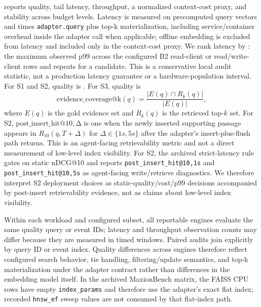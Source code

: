 \sys reports quality, tail latency, throughput, a normalized context-cost proxy, and stability across budget levels. Latency is measured on precomputed query vectors and times \texttt{adapter.query} plus top-k materialization, including service/container overhead inside the adapter call when applicable; offline embedding is excluded from latency and included only in the context-cost proxy. We rank latency by \maxrowp: the maximum observed p99 across the configured B2 read-client or read/write-client rows and repeats for a candidate. This is a conservative local audit statistic, not a production latency guarantee or a hardware-population interval. For S1 and S2, quality is \ndcg. For S3, quality is
\[
\mathrm{evidence\_coverage@k}(q)=\frac{|E(q)\cap R_k(q)|}{|E(q)|},
\]
where $E(q)$ is the gold evidence set and $R_k(q)$ is the retrieved top-$k$ set. For S2, \(\mathrm{post\_insert\_hit@10,\Delta}\) is one when the newly inserted supporting passage appears in $R_{10}(q,T+\Delta)$ for $\Delta\in\{1s,5s\}$ after the adapter's insert-plus-flush path returns. This is an agent-facing retrievability metric and not a direct measurement of low-level index visibility. For S2, the archived strict-latency rule gates on static nDCG@10 and reports \texttt{post\_insert\_hit@10,1s} and \texttt{post\_insert\_hit@10,5s} as agent-facing write/retrieve diagnostics. We therefore interpret S2 deployment choices as static-quality/cost/p99 decisions accompanied by post-insert retrievability evidence, not as claims about low-level index visibility.

Within each workload and configured subset, all reportable engines evaluate the same quality query or event IDs; latency and throughput observation counts may differ because they are measured in timed windows. Paired audits join explicitly by query ID or event index. Quality differences across engines therefore reflect configured search behavior, tie handling, filtering/update semantics, and top-k materialization under the adapter contract rather than differences in the embedding model itself. In the archived MaxionBench matrix, the FAISS CPU rows have empty \texttt{index\_params} and therefore use the adapter's exact flat index; recorded \texttt{hnsw\_ef} sweep values are not consumed by that flat-index path.

